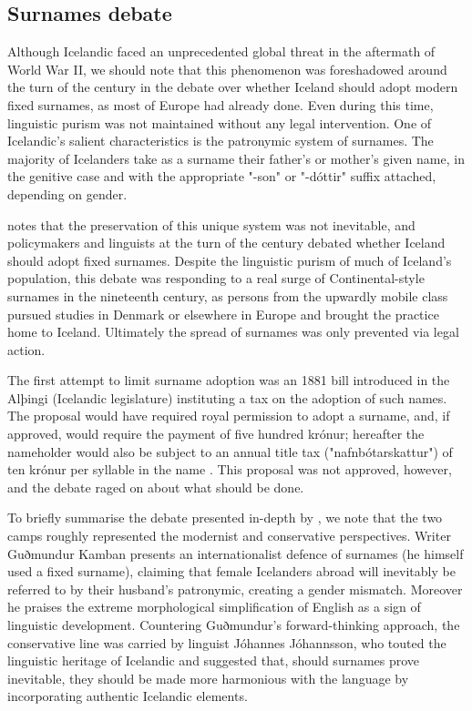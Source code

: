 \subsection{Surnames debate}

Although Icelandic faced an unprecedented global threat in the aftermath of
World War II, we should note that this phenomenon was foreshadowed around the
turn of the century in the debate over whether Iceland should adopt modern
fixed surnames, as most of Europe had already done. Even during this time,
linguistic purism was not maintained without any legal intervention. One of
Icelandic's salient characteristics is the patronymic system of surnames. The
majority of Icelanders take as a surname their father's or mother's given name,
in the genitive case and with the appropriate "-son" or "-dóttir" suffix
attached, depending on gender.

\parencite{willson02} notes that the preservation of this unique system was not
inevitable, and policymakers and linguists at the turn of the century debated
whether Iceland should adopt fixed surnames. Despite the linguistic purism of
much of Iceland's population, this debate was responding to a real surge of
Continental-style surnames in the nineteenth century, as persons from the
upwardly mobile class pursued studies in Denmark or elsewhere in Europe and
brought the practice home to Iceland. Ultimately the spread of surnames was
only prevented via legal action.

The first attempt to limit surname adoption was an 1881 bill introduced in the
Alþingi (Icelandic legislature) instituting a tax on the adoption of such
names. The proposal would have required royal permission to adopt a surname,
and, if approved, would require the payment of five hundred krónur; hereafter
the nameholder would also be subject to an annual title tax
("nafnbótarskattur") of ten krónur per syllable in the name
\parencite[137]{willson02}. This proposal was not approved, however, and the
debate raged on about what should be done.

To briefly summarise the debate presented in-depth by \textcite{willson02}, we
note that the two camps roughly represented the modernist and conservative
perspectives. Writer Guðmundur Kamban presents an internationalist defence of
surnames (he himself used a fixed surname), claiming that female Icelanders
abroad will inevitably be referred to by their husband's patronymic, creating a
gender mismatch. Moreover he praises the extreme morphological simplification
of English as a sign of linguistic development. Countering Guðmundur's
forward-thinking approach, the conservative line was carried by linguist
Jóhannes Jóhannsson, who touted the linguistic heritage of Icelandic and
suggested that, should surnames prove inevitable, they should be made more
harmonious with the language by incorporating authentic Icelandic elements.

